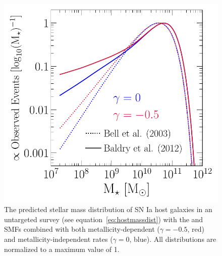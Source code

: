 \documentclass[ms.tex]{subfiles}
\begin{document}
\begin{figure}
\centering
\includegraphics[scale = 0.55]{ia_massdist.pdf}
\caption{
The predicted stellar mass distribution of SN Ia host galaxies in an
untargeted survey (see equation~\ref{eq:hostmassdist}) with the
\citet[][dotted]{Bell2003} and~\citet[][solid]{Baldry2012} SMFs combined with
both metallicity-dependent ($\gamma = -0.5$, red) and metallicity-independent
rates ($\gamma = 0$, blue).
All distributions are normalized to a maximum value of 1.
}
\label{fig:hostmassdist}
\end{figure}
\end{document}
